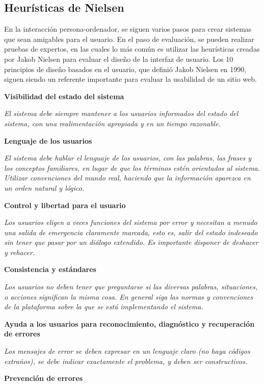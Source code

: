 \subsection{Heurísticas de Nielsen}
En la interacción persona-ordenador, se siguen varios pasos para crear sistemas que sean amigables para el usuario. En el paso de evaluación, se pueden realizar pruebas de expertos, en las cuales lo más común es utilizar las heurísticas creadas por Jakob Nielsen para evaluar el diseño de la interfaz de usuario. Los 10 principios de diseño basados en el usuario, que definió Jakob Nielsen en 1990, siguen siendo un referente importante para evaluar la usabilidad de un sitio web.

\noindent
\textbf{Visibilidad del estado del sistema}

\textit{El sistema debe siempre mantener a los usuarios informados del estado del sistema, con una realimentación apropiada y en un tiempo razonable.}

\noindent
\textbf{Lenguaje de los usuarios}

\textit{El sistema debe hablar el lenguaje de los usuarios, con las palabras, las frases y los conceptos familiares, en lugar de que los términos estén orientados al sistema. Utilizar convenciones del mundo real, haciendo que la información aparezca en un orden natural y lógico.}

\noindent
\textbf{Control y libertad para el usuario}

\textit{Los usuarios eligen a veces funciones del sistema por error y necesitan a menudo una salida de emergencia claramente marcada, esto es, salir del estado indeseado sin tener que pasar por un diálogo extendido. Es importante disponer de deshacer y rehacer.}

\noindent
\textbf{Consistencia y estándares}

\textit{Los usuarios no deben tener que preguntarse si las diversas palabras, situaciones, o acciones significan la misma cosa. En general siga las normas y convenciones de la plataforma sobre la que se está implementando el sistema.}

\noindent
\textbf{Ayuda a los usuarios para reconocimiento, diagnóstico y recuperación de errores}

\textit{Los mensajes de error se deben expresar en un lenguaje claro (no haya códigos extraños), se debe indicar exactamente el problema, y deben ser constructivos.}

\noindent
\textbf{Prevención de errores}

